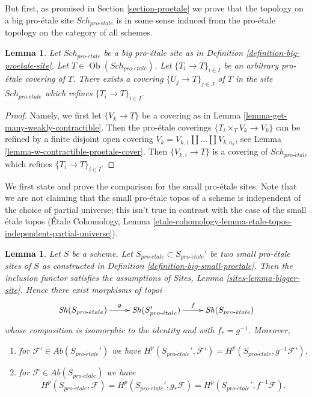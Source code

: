 \documentclass{stacks-project}
\theoremstyle{plain}
\newtheorem{lemma}[subsection]{Lemma}
\theoremstyle{definition}
\theoremstyle{remark}
\numberwithin{equation}{subsection}
\def\Sch{\mathit{Sch}}
\def\Ob{\mathop{\mathrm{Ob}}\nolimits}
\def\Sh{\mathop{\mathit{Sh}}\nolimits}
\def\proetale{{pro\text{-}\acute{e}tale}}
\begin{document}
\medskip\noindent
But first, 
as promised in Section \ref{section-proetale} we prove that the topology on a
big pro-\'etale site $\Sch_\proetale$ is in some sense induced from
the pro-\'etale topology on the category of all schemes.

\begin{lemma}
\label{lemma-proetale-induced}
Let $\Sch_\proetale$ be a big pro-\'etale site as in
Definition \ref{definition-big-proetale-site}.
Let $T \in \Ob(\Sch_\proetale)$.
Let $\{T_i \to T\}_{i \in I}$ be an arbitrary pro-\'etale covering of $T$.
There exists a covering $\{U_j \to T\}_{j \in J}$ of $T$ in the site
$\Sch_\proetale$ which refines $\{T_i \to T\}_{i \in I}$.
\end{lemma}

\begin{proof}
Namely, we first let $\{V_k \to T\}$ be a covering as in
Lemma \ref{lemma-get-many-weakly-contractible}.
Then the pro-\'etale coverings $\{T_i \times_T V_k \to V_k\}$
can be refined by a finite disjoint open covering
$V_k = V_{k, 1} \amalg \ldots \amalg V_{k, n_k}$, see
Lemma \ref{lemma-w-contractible-proetale-cover}.
Then $\{V_{k, i} \to T\}$ is a covering of $\Sch_\proetale$
which refines $\{T_i \to T\}_{i \in I}$.
\end{proof}

\noindent
We first state and prove the comparison for the small pro-\'etale
sites. Note that we are not claiming that the small pro-\'etale topos
of a scheme is independent of the choice of partial universe; this isn't
true in contrast with the case of the small \'etale topos
(\'Etale Cohomology, Lemma
\ref{etale-cohomology-lemma-etale-topos-independent-partial-universe}).

\begin{lemma}
\label{lemma-proetale-cohomology-independent-partial-universe}
Let $S$ be a scheme. Let $S_\proetale \subset S_\proetale'$ be
two small pro-\'etale sites of $S$ as constructed in
Definition \ref{definition-big-small-proetale}. Then the inclusion functor
satisfies the assumptions of 
Sites, Lemma \ref{sites-lemma-bigger-site}.
Hence there exist morphisms of topoi
$$
\xymatrix{
\Sh(S_\proetale) \ar[r]^g &
\Sh(S_\proetale') \ar[r]^f &
\Sh(S_\proetale)
}
$$
whose composition is isomorphic to the identity and with $f_* = g^{-1}$.
Moreover,
\begin{enumerate}
\item for $\mathcal{F}' \in \textit{Ab}(S_\proetale')$ we have
$H^p(S_\proetale', \mathcal{F}') = H^p(S_\proetale, g^{-1}\mathcal{F}')$,
\item for $\mathcal{F} \in \textit{Ab}(S_\proetale)$ we have
$$
H^p(S_\proetale, \mathcal{F}) =
H^p(S_\proetale', g_*\mathcal{F}) =
H^p(S_\proetale', f^{-1}\mathcal{F}).
$$
\end{enumerate}
\end{lemma}
\end{document}
